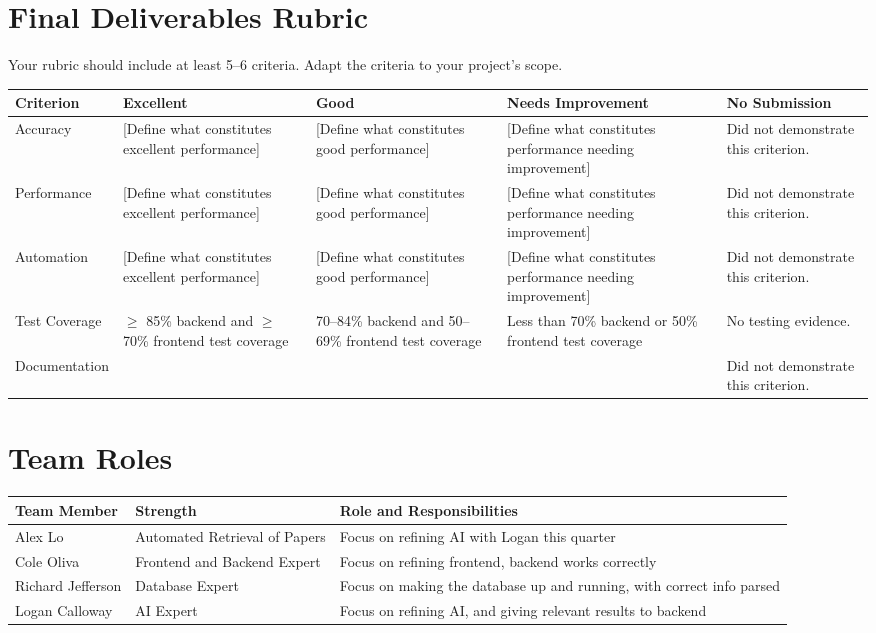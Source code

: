 \documentclass{article}
\begin{document}
\section*{Final Deliverables Rubric}
Your rubric should include at least 5--6 criteria. Adapt the criteria to your project’s scope.  

\begin{tabularx}{\textwidth}{|X|X|X|X|X|}
    \hline
    \textbf{Criterion} & \textbf{Excellent} & \textbf{Good} & \textbf{Needs Improvement} & \textbf{No Submission}\\
    \hline
    Accuracy & [Define what constitutes excellent performance] & [Define what constitutes good performance] & [Define what constitutes performance needing improvement] & Did not demonstrate this criterion. \\
    \hline     
    Performance & [Define what constitutes excellent performance] & [Define what constitutes good performance] & [Define what constitutes performance needing improvement] & Did not demonstrate this criterion. \\
    \hline
    Automation & [Define what constitutes excellent performance] & [Define what constitutes good performance] & [Define what constitutes performance needing improvement] & Did not demonstrate this criterion. \\
    \hline     
     Test Coverage & $\geq$ 85\% backend and $\geq$ 70\% frontend test coverage & 70--84\% backend and 50--69\% frontend test coverage & Less than 70\% backend or 50\% frontend test coverage & No testing evidence. \\
    \hline
    Documentation &  &  &  & Did not demonstrate this criterion. \\
    \hline
    
\end{tabularx}



\section*{Team Roles}


\begin{tabularx}{\textwidth}{|X|X|X|}
    \hline
    \textbf{Team Member} & \textbf{Strength} & \textbf{Role and Responsibilities} \\
    \hline
    Alex Lo & Automated Retrieval of Papers & Focus on refining AI with Logan this quarter \\
    \hline
    Cole Oliva & Frontend and Backend Expert & Focus on refining frontend, backend works correctly\\
    \hline
    Richard Jefferson & Database Expert & Focus on making the database up and running, with correct info parsed \\
    \hline
    Logan Calloway & AI Expert & Focus on refining AI, and giving relevant results to backend \\
    \hline
\end{tabularx}
\end{document}
